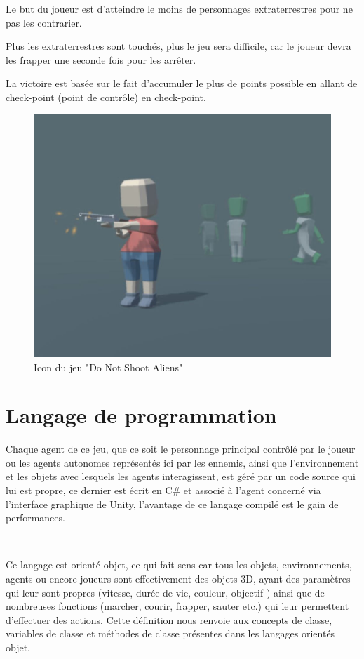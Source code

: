 Le but du joueur est d’atteindre le moins de personnages extraterrestres pour ne pas les contrarier.

Plus les extraterrestres sont touchés, plus le jeu sera difficile, car le joueur devra les frapper une seconde fois pour les arrêter. 

La victoire est basée sur le fait d’accumuler le plus de points possible en allant de check-point (point de contrôle) en check-point.

\begin{figure}[th]
\centering
\includegraphics{Figures/72unity.JPG}
\decoRule
\caption[Icon du jeu "Do Not Shoot Aliens"]{Icon du jeu "Do Not Shoot Aliens"}
\label{fig:7.2}
\end{figure}

\section{Langage de programmation}

Chaque agent de ce jeu, que ce soit le personnage principal contrôlé par le joueur ou les agents autonomes représentés ici par les ennemis, ainsi que l’environnement et les objets avec lesquels les agents interagissent, est géré par un code source qui lui est propre, ce dernier est écrit en C\# et associé à l'agent concerné via l'interface graphique de Unity, l'avantage de ce langage compilé est le gain de performances.

~\par
Ce langage est orienté objet, ce qui fait sens car tous les objets, environnements, agents ou encore joueurs sont effectivement des objets 3D, ayant des paramètres qui leur sont propres (vitesse, durée de vie, couleur, objectif ) ainsi que de nombreuses fonctions (marcher, courir, frapper, sauter etc.) qui leur permettent d’effectuer des actions. Cette définition nous renvoie aux concepts de classe, variables de classe et méthodes de classe présentes dans les langages orientés objet.


